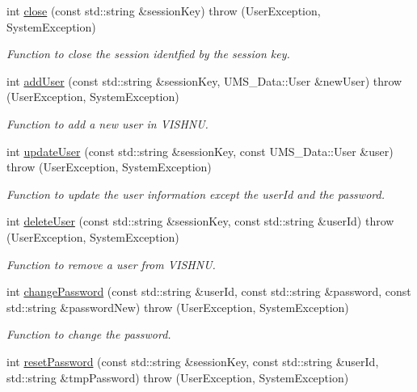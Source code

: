 \begin{DoxyCompactItemize}
int \hyperlink{namespacevishnu_a925f5cdd60d012ebd98cd328ed60d398}{close} (const std::string \&sessionKey)  throw (UserException, SystemException)
\begin{DoxyCompactList}\small\item\em Function to close the session identfied by the session key. \item\end{DoxyCompactList}\item 
int \hyperlink{namespacevishnu_ac7cd83030f8f6e990001b238a9f50640}{addUser} (const std::string \&sessionKey, UMS\_\-Data::User \&newUser)  throw (UserException, SystemException)
\begin{DoxyCompactList}\small\item\em Function to add a new user in VISHNU. \item\end{DoxyCompactList}\item 
int \hyperlink{namespacevishnu_a1446b24fda1ed0ca910686635b6bb956}{updateUser} (const std::string \&sessionKey, const UMS\_\-Data::User \&user)  throw (UserException, SystemException)
\begin{DoxyCompactList}\small\item\em Function to update the user information except the userId and the password. \item\end{DoxyCompactList}\item 
int \hyperlink{namespacevishnu_a6c83f6b72fdb7ac3b240f14a19f11786}{deleteUser} (const std::string \&sessionKey, const std::string \&userId)  throw (UserException, SystemException)
\begin{DoxyCompactList}\small\item\em Function to remove a user from VISHNU. \item\end{DoxyCompactList}\item 
int \hyperlink{namespacevishnu_a24ec95c164ce8905b8eccf98e9bb633e}{changePassword} (const std::string \&userId, const std::string \&password, const std::string \&passwordNew)  throw (UserException, SystemException)
\begin{DoxyCompactList}\small\item\em Function to change the password. \item\end{DoxyCompactList}\item 
int \hyperlink{namespacevishnu_a11f16b7501b8814c491d13431409051c}{resetPassword} (const std::string \&sessionKey, const std::string \&userId, std::string \&tmpPassword)  throw (UserException, SystemException)

\end{DoxyCompactItemize}
